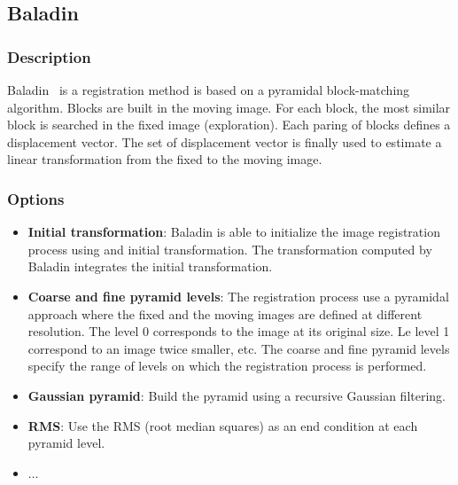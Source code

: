 \subsection{Baladin}



\subsubsection{Description}

Baladin~\cite{Ourselin_MICCAI_2000} is a registration method is based on a pyramidal block-matching algorithm. Blocks are built in the moving image. For each block, the most similar block is searched in the fixed image (exploration). Each paring of blocks defines a displacement vector. The set of displacement vector is finally used to estimate a linear transformation from the fixed to the moving image.


\subsubsection{Options}


\begin{itemize}
%
\item \textbf{Initial transformation}: Baladin is able to initialize the image registration process using and initial transformation. The transformation computed by Baladin integrates the initial transformation.
%
\item \textbf{Coarse and fine pyramid levels}: The registration process use a pyramidal approach where the fixed and the moving images are defined at different resolution. The level 0 corresponds to the image at its original size. Le level 1 correspond to an image twice smaller, etc. The coarse and fine pyramid levels specify the range of levels on which the registration process is performed.
%
\item \textbf{Gaussian pyramid}: Build the pyramid using a recursive Gaussian filtering.
%
\item \textbf{RMS}: Use the RMS (root median squares) as an end condition at each pyramid level.
%
\item ...
%
\end{itemize}


